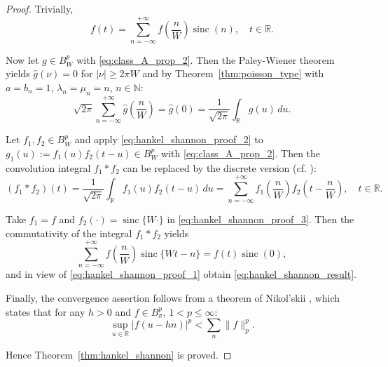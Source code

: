 \documentclass[11pt]{article}
\theoremstyle{plain}
\begin{document}
\begin{proof}
Trivially,
\begin{equation}
f(t) = \sum_{n=-\infty}^{+\infty} f\left(\frac{n}{W}\right) \operatorname{sinc}(n), \quad t \in \mathbb{R}.
\label{eq:hankel_shannon_proof_1}
\end{equation}

Now let $g \in B_W^p$ with \eqref{eq:class_A_prop_2}. Then the Paley-Wiener theorem yields $\hat{g}(\nu) = 0$ for $|\nu| \geq 2\pi W$ and by Theorem~\ref{thm:poisson_type} with $a = b_n = 1$, $\lambda_n = \mu_n = n$, $n \in \mathbb{N}$:
\begin{equation}
\sqrt{2\pi} \sum_{n=-\infty}^{+\infty} \hat{g}\left(\frac{n}{W}\right) = \hat{g}(0) = \frac{1}{\sqrt{2\pi}} \int_{\mathbb{R}} g(u) \, du.
\label{eq:hankel_shannon_proof_2}
\end{equation}

Let $f_1, f_2 \in B_W^p$ and apply \eqref{eq:hankel_shannon_proof_2} to $g_1(u) := f_1(u) f_2(t - u) \in B_W^p$ with \eqref{eq:class_A_prop_2}. Then the convolution integral $f_1 * f_2$ can be replaced by the discrete version (cf. \cite{8}):
\begin{equation}
(f_1 * f_2)(t) = \frac{1}{\sqrt{2\pi}} \int_{\mathbb{R}} f_1(u) f_2(t-u) \, du = \sum_{n=-\infty}^{+\infty} f_1\left(\frac{n}{W}\right) f_2\left(t - \frac{n}{W}\right), \quad t \in \mathbb{R}.
\label{eq:hankel_shannon_proof_3}
\end{equation}

Take $f_1 = f$ and $f_2(\cdot) = \operatorname{sinc}\{W \cdot \}$ in \eqref{eq:hankel_shannon_proof_3}. Then the commutativity of the integral $f_1 * f_2$ yields
\begin{equation}
\sum_{n=-\infty}^{+\infty} f\left(\frac{n}{W}\right) \operatorname{sinc}\{Wt - n\} = f(t) \operatorname{sinc}(0),
\label{eq:hankel_shannon_proof_4}
\end{equation}
and in view of \eqref{eq:hankel_shannon_proof_1} obtain \eqref{eq:hankel_shannon_result}.

Finally, the convergence assertion follows from a theorem of Nikol'skii \cite{25}, which states that for any $h > 0$ and $f \in B_\sigma^p$, $1 < p \leq \infty$:
\begin{equation}
\sup_{u \in \mathbb{R}} |f(u - hn)|^p < \sum_{n} \|f\|_p^p.
\label{eq:nikol_skii}
\end{equation}

Hence Theorem~\ref{thm:hankel_shannon} is proved.
\end{proof}
\end{document}
